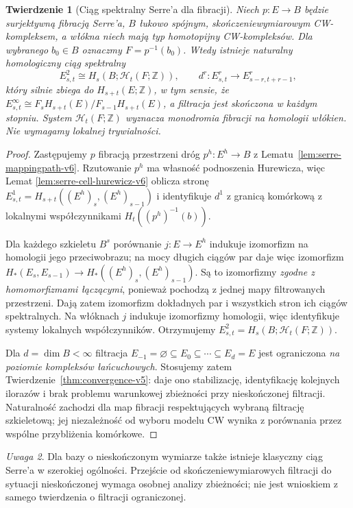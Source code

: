 \documentclass[11pt,a4paper,oneside]{report}
\newcommand{\Z}{\mathbb{Z}}
\theoremstyle{plain}
\newtheorem{twierdzenie}{Twierdzenie}[section]
\theoremstyle{definition}
\theoremstyle{remark}
\newtheorem{uwaga}[twierdzenie]{Uwaga}
\begin{document}
\begin{twierdzenie}[Ciąg spektralny Serre'a dla fibracji]
\label{thm:serre-general-v6}
Niech $p:E\to B$ będzie surjektywną fibracją Serre'a,
$B$ łukowo spójnym, skończeniewymiarowym CW-kompleksem,
a włókna niech mają typ homotopijny CW-kompleksów.
Dla wybranego $b_0\in B$ oznaczmy $F=p^{-1}(b_0)$.
Wtedy istnieje naturalny homologiczny ciąg spektralny
\[
E^2_{s,t}\cong H_s(B;\mathcal H_t(F;\Z)),\qquad
 d^r:E^r_{s,t}\longrightarrow E^r_{s-r,t+r-1},
\]
który silnie zbiega do $H_{s+t}(E;\Z)$, w tym sensie, że
$E^\infty_{s,t}\cong F_sH_{s+t}(E)/F_{s-1}H_{s+t}(E)$,
a filtracja jest skończona w każdym stopniu.
System $\mathcal H_t(F;\Z)$ wyznacza monodromia fibracji
na homologii włókien. Nie wymagamy lokalnej trywialności.
\end{twierdzenie}
\begin{proof}
Zastępujemy $p$ fibracją przestrzeni dróg $p^h:E^h\to B$
z Lematu~\ref{lem:serre-mappingpath-v6}. Rzutowanie $p^h$
ma własność podnoszenia Hurewicza, więc Lemat
\ref{lem:serre-cell-hurewicz-v6} oblicza stronę
$E^1_{s,t}=H_{s+t}((E^h)_s,(E^h)_{s-1})$
i identyfikuje $d^1$ z granicą komórkową z lokalnymi
współczynnikami $H_t((p^h)^{-1}(b))$.

Dla każdego szkieletu $B^s$ porównanie $j:E\to E^h$
indukuje izomorfizm na homologii jego przeciwobrazu;
na mocy długich ciągów par daje więc izomorfizm
$H_* (E_s,E_{s-1})\to H_*((E^h)_s,(E^h)_{s-1})$.
Są to izomorfizmy \emph{zgodne z homomorfizmami łączącymi},
ponieważ pochodzą z jednej mapy filtrowanych przestrzeni.
Dają zatem izomorfizm dokładnych par i wszystkich
stron ich ciągów spektralnych. Na włóknach $j$ indukuje
izomorfizmy homologii, więc identyfikuje systemy
lokalnych współczynników. Otrzymujemy
$E^2_{s,t}=H_s(B;\mathcal H_t(F;\Z))$.

Dla $d=\dim B<\infty$ filtracja
$E_{-1}=\varnothing\subseteq E_0\subseteq\cdots
\subseteq E_d=E$ jest ograniczona \emph{na poziomie
kompleksów łańcuchowych}. Stosujemy zatem
Twierdzenie~\ref{thm:convergence-v5}: daje ono stabilizację,
identyfikację kolejnych ilorazów i brak problemu
warunkowej zbieżności przy nieskończonej filtracji.
Naturalność zachodzi dla map fibracji respektujących
wybraną filtrację szkieletową; jej niezależność od wyboru
modelu CW wynika z porównania przez wspólne
przybliżenia komórkowe.
\end{proof}
\begin{uwaga}
Dla bazy o nieskończonym wymiarze także istnieje klasyczny
ciąg Serre'a w szerokiej ogólności. Przejście od
skończeniewymiarowych filtracji do sytuacji nieskończonej
wymaga osobnej analizy zbieżności; nie jest wnioskiem
z samego twierdzenia o filtracji ograniczonej.
\end{uwaga}
\end{document}
